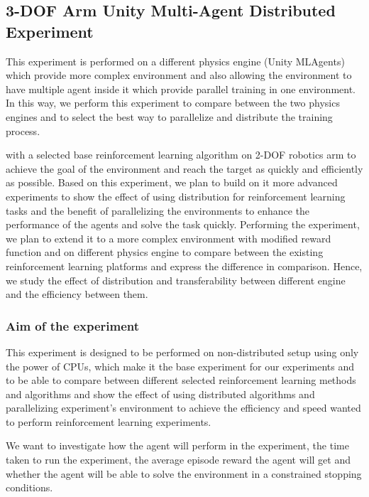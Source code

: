 
\subsection{3-DOF Arm Unity Multi-Agent Distributed Experiment}

This experiment is performed on a different physics engine (Unity MLAgents) which provide more complex environment and also allowing the environment to have multiple agent inside it which provide parallel training in one environment. 
In this way, we perform this experiment to compare between the two physics engines and to select the best way to parallelize and distribute the training process.

with a selected base reinforcement learning algorithm on 2-DOF robotics arm to achieve the goal of the environment and reach the target as quickly and efficiently as possible.
Based on this experiment, we plan to build on it more advanced experiments to show the effect of using distribution for reinforcement learning tasks and the benefit of parallelizing the environments to enhance the performance of the agents and solve the task quickly. Performing the experiment, we plan to extend it to a more complex environment with modified reward function and on different physics engine to compare between the existing reinforcement learning platforms and express the difference in comparison. Hence, we study the effect of distribution and transferability between different engine and the efficiency between them.

\subsubsection{Aim of the experiment}

This experiment is designed to be performed on non-distributed setup using only the power of CPUs, which make it the base experiment for our experiments and to be able to compare between different selected reinforcement learning methods and algorithms and show the effect of using distributed algorithms and parallelizing experiment's environment to achieve the efficiency and speed wanted to perform reinforcement learning experiments. 

We want to investigate how the agent will perform in the experiment, the time taken to run the experiment, the average episode reward the agent will get and whether the agent will be able to solve the environment in a constrained stopping conditions.

